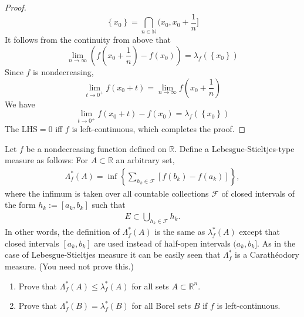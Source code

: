 \documentclass[../main.tex]{subfiles}
\begin{document}
\begin{proof}
     \[
     \left\{ x_0 \right\}= \bigcap_{n\in \mathbb{N} } (x_0,x_0+ \frac{1 }{n } ]
     \] It follows from the continuity from above that \[
   \lim_{n\to \infty}\left(    f\left( x_0+ \frac{1 }{n }  \right)-f\left( x_0 \right) \right) =  \lambda _{f} \left( \left\{ x_0 \right\} \right)   
     \] Since \(  f  \) is nondecreasing, \[
     \lim_{t\to 0^{+ }}f\left( x_0+ t \right)= \lim_{n\to \infty}f\left( x_0+ \frac{1 }{n }  \right)  
     \]  We have \[
     \lim_{t\to 0^{+ }}f\left( x_0+ t \right)-f\left( x_0 \right) =  \lambda _{f} \left( \left\{ x_0 \right\} \right)  
     \] The LHS\(  = 0  \) iff \(  f  \) is left-continuous, which completes the proof.  
\end{proof}
\begin{exercise}{}{}
    Let $f$ be a nondecreasing function defined on $\mathbb{R}$. Define a Lebesgue-Stieltjes-type measure as follows: For $A \subset \mathbb{R}$ an arbitrary set,
\[\begin{aligned}
\Lambda_{f}^{*}(A) = \inf \left\{ \sum_{h_k \in \mathcal{F}} [f(b_k) - f(a_k)] \right\},
\end{aligned}\]
where the infimum is taken over all countable collections $\mathcal{F}$ of closed intervals of the form $h_k := [a_k, b_k]$ such that
\[\begin{aligned}
E \subset \bigcup_{h_k \in \mathcal{F}} h_k.
\end{aligned}\]
In other words, the definition of $\Lambda_f^*(A)$ is the same as $\lambda_f^*(A)$ except that closed intervals $[a_k, b_k]$ are used instead of half-open intervals $(a_k, b_k]$.
As in the case of Lebesgue-Stieltjes measure it can be easily seen that $\Lambda_f^*$ is a Carathéodory measure. (You need not prove this.)
\begin{enumerate}
\item[(a)] Prove that $\Lambda_f^*(A) \le \lambda_f^*(A)$ for all sets $A \subset \mathbb{R}^n$.
\item[(b)] Prove that $\Lambda_f^*(B) = \lambda_f^*(B)$ for all Borel sets $B$ if $f$ is left-continuous.
\end{enumerate}
\end{exercise}
\end{document}
